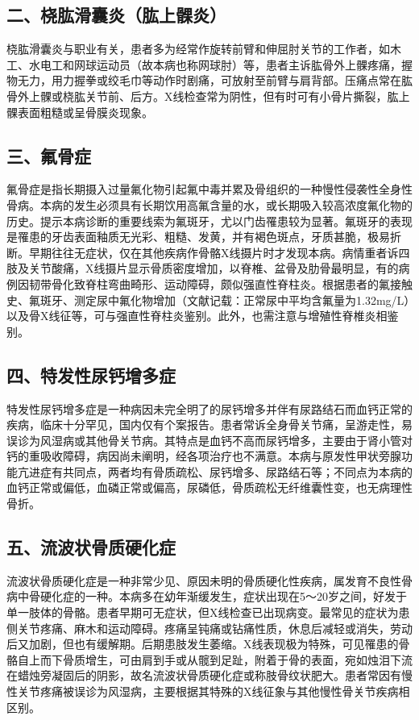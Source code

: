 \subsection{二、桡肱滑囊炎（肱上髁炎）}

桡肱滑囊炎与职业有关，患者多为经常作旋转前臂和伸屈肘关节的工作者，如木工、水电工和网球运动员（故本病也称网球肘）等，患者主诉肱骨外上髁疼痛，握物无力，用力握拳或绞毛巾等动作时剧痛，可放射至前臂与肩背部。压痛点常在肱骨外上髁或桡肱关节前、后方。X线检查常为阴性，但有时可有小骨片撕裂，肱上髁表面粗糙或呈骨膜炎现象。

\subsection{三、氟骨症}

氟骨症是指长期摄入过量氟化物引起氟中毒并累及骨组织的一种慢性侵袭性全身性骨病。本病的发生必须具有长期饮用高氟含量的水，或长期吸入较高浓度氟化物的历史。提示本病诊断的重要线索为氟斑牙，尤以门齿罹患较为显著。氟斑牙的表现是罹患的牙齿表面釉质无光彩、粗糙、发黄，并有褐色斑点，牙质甚脆，极易折断。早期往往无症状，仅在其他疾病作骨骼X线摄片时才发现本病。病情重者诉四肢及关节酸痛，X线摄片显示骨质密度增加，以脊椎、盆骨及肋骨最明显，有的病例因韧带骨化致脊柱弯曲畸形、运动障碍，颇似强直性脊柱炎。根据患者的氟接触史、氟斑牙、测定尿中氟化物增加（文献记载：正常尿中平均含氟量为1.32mg/L）以及骨X线征等，可与强直性脊柱炎鉴别。此外，也需注意与增殖性脊椎炎相鉴别。

\subsection{四、特发性尿钙增多症}

特发性尿钙增多症是一种病因未完全明了的尿钙增多并伴有尿路结石而血钙正常的疾病，临床十分罕见，国内仅有个案报告。患者常诉全身骨关节痛，呈游走性，易误诊为风湿病或其他骨关节病。其特点是血钙不高而尿钙增多，主要由于肾小管对钙的重吸收障碍，病因尚未阐明，经各项治疗也不满意。本病与原发性甲状旁腺功能亢进症有共同点，两者均有骨质疏松、尿钙增多、尿路结石等；不同点为本病的血钙正常或偏低，血磷正常或偏高，尿磷低，骨质疏松无纤维囊性变，也无病理性骨折。

\subsection{五、流波状骨质硬化症}

流波状骨质硬化症是一种非常少见、原因未明的骨质硬化性疾病，属发育不良性骨病中骨硬化症的一种。本病多在幼年渐缓发生，症状出现在5～20岁之间，好发于单一肢体的骨骼。患者早期可无症状，但X线检查已出现病变。最常见的症状为患侧关节疼痛、麻木和运动障碍。疼痛呈钝痛或钻痛性质，休息后减轻或消失，劳动后又加剧，但也有缓解期。后期患肢发生萎缩。X线表现极为特殊，可见罹患的骨骼自上而下骨质增生，可由肩到手或从髋到足趾，附着于骨的表面，宛如烛泪下流在蜡烛旁凝固后的阴影，故名流波状骨质硬化症或称肢骨纹状肥大。患者常因有慢性关节疼痛被误诊为风湿病，主要根据其特殊的X线征象与其他慢性骨关节疾病相区别。

